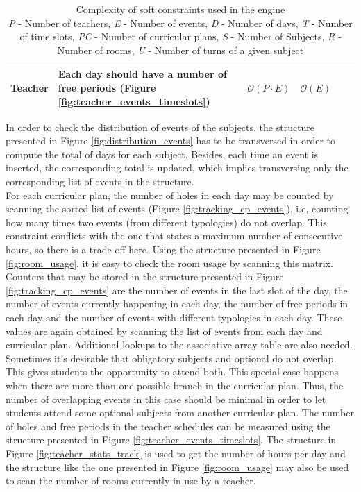 \begin{table}[H]
{\begin{tabular}{|p{0.5cm}|p{7cm}|c|c|c|c|}
	Teacher & Each day should have a number of free periods (Figure \ref{fig:teacher_events_timeslots}) & $\mathcal{O}(P\cdot E)$ & $\mathcal{O}(E)$\\
\hline
\end{tabular}%
}
\caption[Complexity of soft constraints used in the engine]{Complexity of soft constraints used in the engine\\\textit{P} - Number of teachers, \textit{E} - Number of events, \textit{D} - Number of days, \textit{T} - Number of time slots, \textit{PC} - Number of curricular plans, \textit{S} - Number of Subjects, \textit{R} - Number of rooms, \textit{U} - Number of turns of a given subject}
\label{tab:new_soft_constraints}
\end{table}

In order to check the distribution of events of the subjects, the structure presented in Figure \ref{fig:distribution_events} has to be transversed in order to compute the total of days for each subject. Besides, each time an event is inserted, the corresponding total is updated, which implies transversing only the corresponding list of events in the structure.\\
For each curricular plan, the number of holes in each day may be counted by scanning the sorted list of events (Figure \ref{fig:tracking_cp_events}), i.e, counting how many times two events (from different typologies) do not overlap. This constraint conflicts with the one that states a maximum number of consecutive hours, so there is a trade off here.  
Using the structure presented in Figure \ref{fig:room_usage}, it is easy to check the room usage by scanning this matrix.  Counters that may be stored in the structure presented in Figure \ref{fig:tracking_cp_events} are the number of events in the last slot of the day, the number of events currently happening in each day, the number of free periods in each day and the number of events with different typologies in each day. These values are again obtained by scanning the list of events from each day and curricular plan. Additional lookups to the associative array table are also needed.\\
Sometimes it's desirable that obligatory subjects and optional do not overlap. This gives students the opportunity to attend both. This special case happens when there are more than one possible branch in the curricular plan. Thus, the number of overlapping events in this case should be minimal in order to let students attend some optional subjects from another curricular plan.   
The number of holes and free periods in the teacher schedules can be measured using the structure presented in Figure \ref{fig:teacher_events_timeslots}. The structure in Figure \ref{fig:teacher_stats_track} is used to get the number of hours per day and the structure like the one presented in Figure \ref{fig:room_usage} may also be used to scan the number of rooms currently in use by a teacher. 





